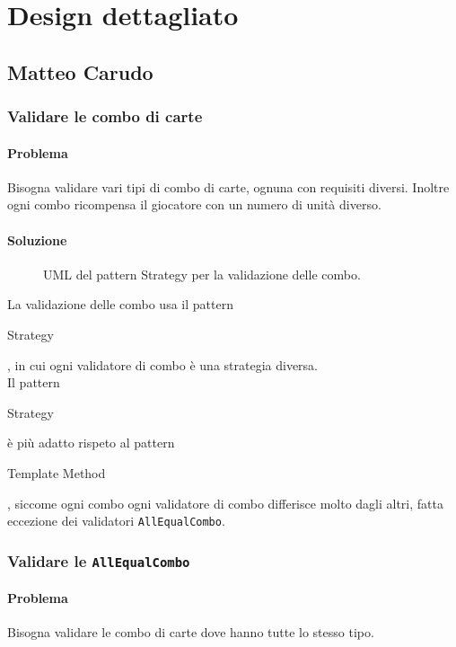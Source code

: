 \documentclass[a4paper,12pt]{report}
\begin{document}
\section{Design dettagliato}
\subsection{Matteo Carudo}
\subsubsection{Validare le combo di carte}
\paragraph{Problema}
Bisogna validare vari tipi di combo di carte, ognuna con requisiti diversi. Inoltre ogni combo ricompensa il giocatore con un numero di unità diverso.
\paragraph{Soluzione}
\begin{figure}[H]
	\centering
	
	\caption{UML del pattern Strategy per la validazione delle combo.}
\end{figure}
La validazione delle combo usa il pattern \begin{itshape}Strategy\end{itshape}, in cui ogni validatore di combo è una strategia diversa.
\\
Il pattern \begin{itshape}Strategy\end{itshape} è più adatto rispeto al pattern \begin{itshape}Template Method\end{itshape}, siccome ogni combo ogni validatore di combo differisce molto dagli altri, fatta eccezione dei validatori \texttt{AllEqualCombo}.

\subsubsection{Validare le \texttt{AllEqualCombo}}
\paragraph{Problema}
Bisogna validare le combo di carte dove hanno tutte lo stesso tipo.
\end{document}
